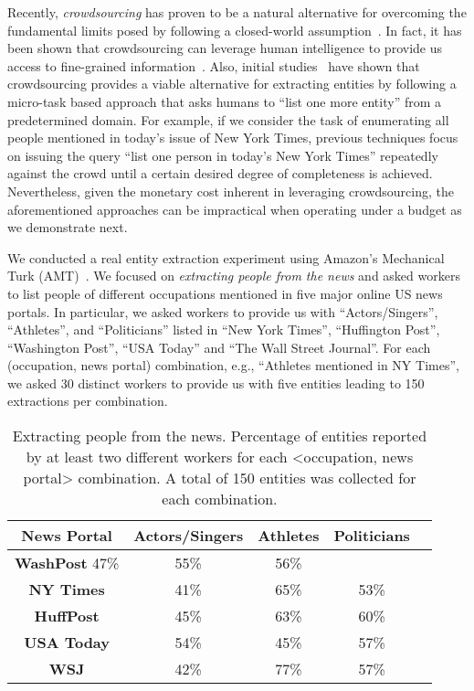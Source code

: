 Recently, {\em crowdsourcing} has proven to be a natural alternative for overcoming the fundamental limits posed by following a closed-world assumption~\cite{franklin:2011}. In fact, it has been shown that crowdsourcing can leverage human intelligence to provide us access to fine-grained information~\cite{deco}. Also, initial studies~\cite{trushkowsky:2013, amsterdamer:2014} have shown that crowdsourcing provides a viable alternative for extracting entities by following a micro-task based approach that asks humans to ``list one more entity'' from a predetermined domain. For example, if we consider the task of enumerating all people mentioned in today's issue of New York Times, previous techniques focus on issuing the query ``list one person in today's New York Times'' repeatedly against the crowd until a certain desired degree of completeness is achieved. Nevertheless, given the monetary cost inherent in leveraging crowdsourcing, the aforementioned approaches can be impractical when operating under a budget as we demonstrate next.

We conducted a real entity extraction experiment using Amazon's Mechanical Turk (AMT)~\cite{mturk}. We focused on {\em extracting people from the news} and asked workers to list people of different occupations mentioned in five major online US news portals. In particular, we asked workers to provide us with ``Actors/Singers'', ``Athletes'', and ``Politicians'' listed in ``New York Times'', ``Huffington Post'', ``Washington Post'', ``USA  Today'' and ``The Wall Street Journal''. For each (occupation, news portal) combination, e.g., ``Athletes mentioned in NY Times'', we asked 30 distinct workers to provide us with five entities leading to 150 extractions per combination.

\vspace{10pt}\begin{table}[h]
\center
\vspace{-10pt}
\caption{Extracting people from the news. Percentage of entities reported by at least two different workers for each <occupation, news portal> combination. A total of 150 entities was collected for each combination.}
\label{tab:duplicates}
\begin{tabular}{|c|c|c|c|c|}
\hline
News Portal & {\bf Actors/Singer}s & {\bf Athletes} & \textbf{Politicians}\\ \hline
{\bf WashPost} 47\% & 55\% & 56\% \\
{\bf NY Times} & 41\%& 65\% & 53\% \\
{\bf HuffPost} & 45\% & 63\% & 60\% \\
{\bf USA Today} & 54\% & 45\% & 57\% \\
{\bf WSJ} & 42\% & 77\% & 57\% \\
\hline
\end{tabular}
\end{table}


